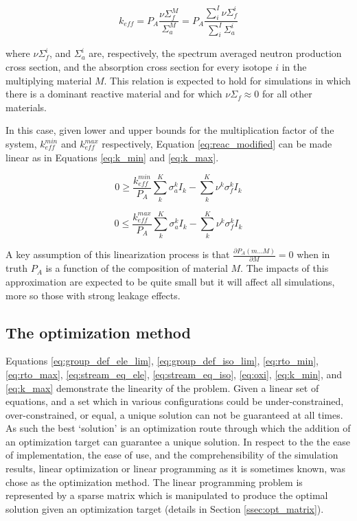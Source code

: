 \begin{equation}
\label{eq:reac_modified}
k_{eff} = P_{A} \frac{\nu\Sigma_{f}^{M}}{\Sigma_{a}^{M}} = P_{A} \frac{\sum\limits^{I}_{i}\nu\Sigma_{f}^{i}}{\sum\limits^{I}_{i}\Sigma_{a}^{i}}
\end{equation}

where $\nu\Sigma_{f}^i$, and $\Sigma_{a}^i$ are, respectively, the spectrum 
averaged neutron production cross section, and the absorption cross section for
every isotope $i$ in the multiplying material $M$. This relation is expected to
hold for simulations in which there is a dominant reactive material and for 
which $\nu\Sigma_{f} \approx 0$ for all other materials.

In this case, given lower and upper bounds for the multiplication factor of the
system, $k_{eff}^{min}$ and $k_{eff}^{max}$ respectively, 
Equation \ref{eq:reac_modified} can be  made linear as in 
Equations \ref{eq:k_min} and \ref{eq:k_max}.

\begin{equation}
\label{eq:k_min}
0 \geq \frac{k_{eff}^{min}}{P_{A}} \sum \limits_{k}^{K} \sigma_{a}^{k} I_{k} - \sum \limits_{k}^{K} \nu^{k} \sigma_{f}^{k} I_{k}
\end{equation}

\begin{equation}
\label{eq:k_max}
0 \leq \frac{k_{eff}^{max}}{P_{A}} \sum \limits_{k}^{K} \sigma_{a}^{k} I_{k} - \sum \limits_{k}^{K} \nu^{k} \sigma_{f}^{k} I_{k}
\end{equation}

A key assumption of this linearization process is that 
$\frac{\partial P_{A}(m...M)}{\partial M} = 0$ when in truth
$P_{A}$ is a function of the composition of material $M$. 
The impacts of this approximation are expected to be quite small but it will 
affect all simulations, more so those with strong leakage effects.
%

\subsection{The optimization method} \label{ssec:opt}
Equations \ref{eq:group_def_ele_lim}, \ref{eq:group_def_iso_lim}, 
\ref{eq:rto_min}, \ref{eq:rto_max}, \ref{eq:stream_eq_ele}, 
\ref{eq:stream_eq_iso}, \ref{eq:oxi}, \ref{eq:k_min}, and \ref{eq:k_max} 
demonstrate the linearity of the problem.  Given a linear
set of equations, and a set which in various configurations could be
under-constrained, over-constrained, or equal, a unique solution can not be
guaranteed at all times. As such the best `solution' is an optimization route
through which the addition of an optimization target can guarantee a unique
solution. In respect to the the ease of implementation, the ease of use, and
the comprehensibility of the simulation results,
linear optimization or linear programming as it is sometimes known, was
chose as the optimization method. The linear
programming problem is represented by a sparse matrix which is manipulated to 
produce the optimal solution given an optimization target 
(details in Section \ref{ssec:opt_matrix}).


